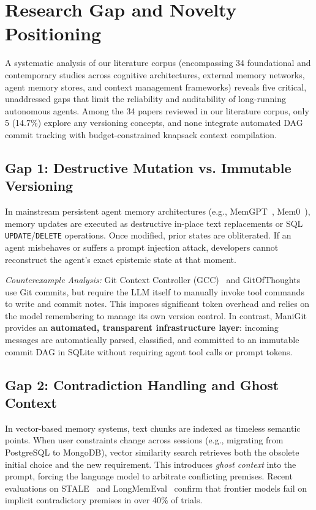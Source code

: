 \section{Research Gap and Novelty Positioning}
\label{sec:research_gap}

A systematic analysis of our literature corpus (encompassing 34 foundational and contemporary studies across cognitive architectures, external memory networks, agent memory stores, and context management frameworks) reveals five critical, unaddressed gaps that limit the reliability and auditability of long-running autonomous agents. Among the 34 papers reviewed in our literature corpus, only 5 (14.7\%) explore any versioning concepts, and none integrate automated DAG commit tracking with budget-constrained knapsack context compilation.

\subsection{Gap 1: Destructive Mutation vs. Immutable Versioning}
In mainstream persistent agent memory architectures (e.g., MemGPT~\cite{packer2023memgpt}, Mem0~\cite{deshmukh2024mem0}), memory updates are executed as destructive in-place text replacements or SQL \texttt{UPDATE}/\texttt{DELETE} operations. Once modified, prior states are obliterated. If an agent misbehaves or suffers a prompt injection attack, developers cannot reconstruct the agent's exact epistemic state at that moment.

\textit{Counterexample Analysis:} Git Context Controller (GCC)~\cite{wu2025gcc} and GitOfThoughts~\cite{shekar2025gitofthoughts} use Git commits, but require the LLM itself to manually invoke tool commands to write and commit notes. This imposes significant token overhead and relies on the model remembering to manage its own version control. In contrast, ManiGit provides an \textbf{automated, transparent infrastructure layer}: incoming messages are automatically parsed, classified, and committed to an immutable commit DAG in SQLite without requiring agent tool calls or prompt tokens.

\subsection{Gap 2: Contradiction Handling and Ghost Context}
In vector-based memory systems, text chunks are indexed as timeless semantic points. When user constraints change across sessions (e.g., migrating from PostgreSQL to MongoDB), vector similarity search retrieves both the obsolete initial choice and the new requirement. This introduces \textit{ghost context} into the prompt, forcing the language model to arbitrate conflicting premises. Recent evaluations on STALE~\cite{stale2025benchmark} and LongMemEval~\cite{wu2024longmemeval} confirm that frontier models fail on implicit contradictory premises in over 40\% of trials.

